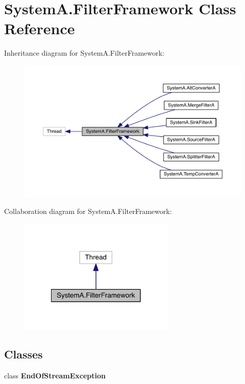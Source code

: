 \hypertarget{class_system_a_1_1_filter_framework}{}\section{System\+A.\+Filter\+Framework Class Reference}
\label{class_system_a_1_1_filter_framework}


Inheritance diagram for System\+A.\+Filter\+Framework\+:\nopagebreak
\begin{figure}[H]
\begin{center}
\leavevmode
\includegraphics[width=350pt]{class_system_a_1_1_filter_framework__inherit__graph}
\end{center}
\end{figure}


Collaboration diagram for System\+A.\+Filter\+Framework\+:\nopagebreak
\begin{figure}[H]
\begin{center}
\leavevmode
\includegraphics[width=210pt]{class_system_a_1_1_filter_framework__coll__graph}
\end{center}
\end{figure}
\subsection*{Classes}
\begin{DoxyCompactItemize}
\item 
class {\bfseries End\+Of\+Stream\+Exception}
\end{DoxyCompactItemize}
